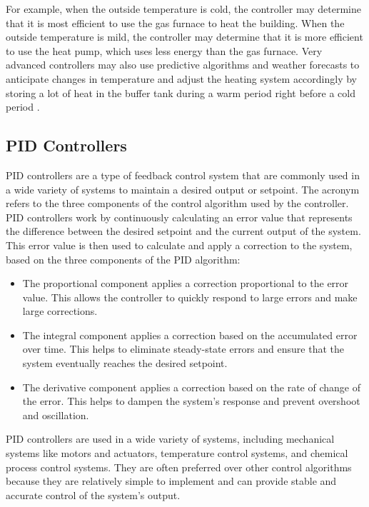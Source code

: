 For example, when the outside temperature is cold, the controller may determine that it is most efficient to use the gas furnace to heat the building. When the outside temperature is mild, the controller may determine that it is more efficient to use the heat pump, which uses less energy than the gas furnace. Very advanced controllers may also use predictive algorithms and weather forecasts to anticipate changes in temperature and adjust the heating system accordingly by storing a lot of heat in the buffer tank during a warm period right before a cold period \cite{demirezen_feasibility_2021}.

\subsection{\acs{PID} Controllers}
\ac{PID} controllers are a type of feedback control system that are commonly used in a wide variety of systems to maintain a desired output or setpoint. The acronym refers to the three components of the control algorithm used by the controller. \ac{PID} controllers work by continuously calculating an error value that represents the difference between the desired setpoint and the current output of the system. This error value is then used to calculate and apply a correction to the system, based on the three components of the \ac{PID} algorithm:
\begin{itemize}
    \item The proportional component applies a correction proportional to the error value. This allows the controller to quickly respond to large errors and make large corrections.
    \item The integral component applies a correction based on the accumulated error over time. This helps to eliminate steady-state errors and ensure that the system eventually reaches the desired setpoint.
    \item The derivative component applies a correction based on the rate of change of the error. This helps to dampen the system's response and prevent overshoot and oscillation.  
\end{itemize}


\ac{PID} controllers are used in a wide variety of systems, including mechanical systems like motors and actuators, temperature control systems, and chemical process control systems. They are often preferred over other control algorithms because they are relatively simple to implement and can provide stable and accurate control of the system's output.

